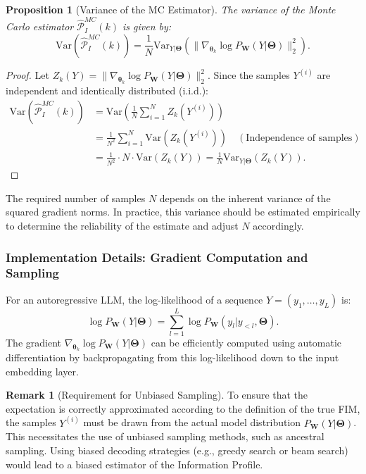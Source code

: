 \documentclass{article}
\newtheorem{proposition}[theorem]{Proposition}
\theoremstyle{definition}
\newtheorem{remark}[theorem]{Remark}
\begin{document}
\begin{proposition}[Variance of the MC Estimator]
\label{prop:mc_variance}
The variance of the Monte Carlo estimator $\hat{\mathcal{P}}_I^{MC}(k)$ is given by:
\begin{equation}
    \text{Var}(\hat{\mathcal{P}}_I^{MC}(k)) = \frac{1}{N} \text{Var}_{Y|\mathbf{\Theta}}\left(\|\nabla_{\boldsymbol{\theta}_k} \log P_{\mathbf{W}}(Y|\mathbf{\Theta})\|_2^2\right).
\end{equation}
\end{proposition}
\begin{proof}
Let $Z_k(Y) = \|\nabla_{\boldsymbol{\theta}_k} \log P_{\mathbf{W}}(Y|\mathbf{\Theta})\|_2^2$. Since the samples $Y^{(i)}$ are independent and identically distributed (i.i.d.):
\begin{align}
    \text{Var}(\hat{\mathcal{P}}_I^{MC}(k)) &= \text{Var}\left(\frac{1}{N} \sum_{i=1}^N Z_k(Y^{(i)})\right) \\
    &= \frac{1}{N^2} \sum_{i=1}^N \text{Var}(Z_k(Y^{(i)})) \quad (\text{Independence of samples}) \\
    &= \frac{1}{N^2} \cdot N \cdot \text{Var}(Z_k(Y)) = \frac{1}{N} \text{Var}_{Y|\mathbf{\Theta}}(Z_k(Y)).
\end{align}
\end{proof}
The required number of samples $N$ depends on the inherent variance of the squared gradient norms. In practice, this variance should be estimated empirically to determine the reliability of the estimate and adjust $N$ accordingly.

\subsubsection{Implementation Details: Gradient Computation and Sampling}
For an autoregressive LLM, the log-likelihood of a sequence $Y=(y_1, \dots, y_L)$ is:
\begin{equation}
    \log P_{\mathbf{W}}(Y|\mathbf{\Theta}) = \sum_{l=1}^L \log P_{\mathbf{W}}(y_l | y_{<l}, \mathbf{\Theta}).
\end{equation}
The gradient $\nabla_{\boldsymbol{\theta}_k} \log P_{\mathbf{W}}(Y|\mathbf{\Theta})$ can be efficiently computed using automatic differentiation by backpropagating from this log-likelihood down to the input embedding layer.

\begin{remark}[Requirement for Unbiased Sampling]
To ensure that the expectation is correctly approximated according to the definition of the true FIM, the samples $Y^{(i)}$ must be drawn from the actual model distribution $P_{\mathbf{W}}(Y|\mathbf{\Theta})$. This necessitates the use of unbiased sampling methods, such as ancestral sampling. Using biased decoding strategies (e.g., greedy search or beam search) would lead to a biased estimator of the Information Profile.
\end{remark}
\end{document}
